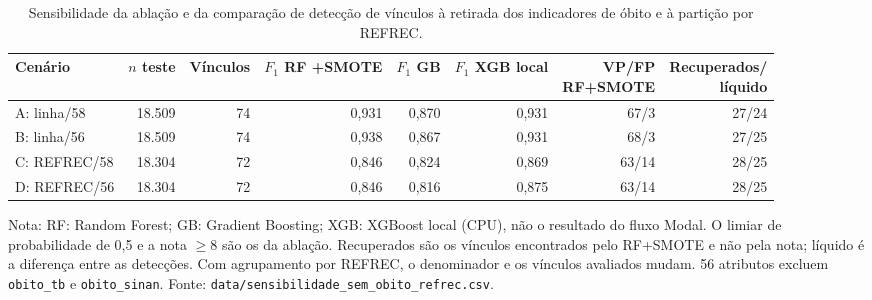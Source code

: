 \begin{table}[htbp]
\centering\footnotesize
\setlength{\tabcolsep}{3pt}
\caption{Sensibilidade da ablação e da comparação de detecção de vínculos à retirada dos indicadores de óbito e à partição por REFREC.}
\label{tab:sensibilidade-2x2}
\begin{tabular}{lrrrrrrr}
\toprule
Cenário & $n$ teste & Vínculos & \shortstack{$F_1$ RF\\+SMOTE} & $F_1$ GB & \shortstack{$F_1$ XGB\\local} & \shortstack{VP/FP\\RF+SMOTE} & \shortstack{Recuperados/\\líquido} \\
\midrule
A: linha/58 & 18.509 & 74 & 0,931 & 0,870 & 0,931 & 67/3 & 27/24 \\
B: linha/56 & 18.509 & 74 & 0,938 & 0,867 & 0,931 & 68/3 & 27/25 \\
C: REFREC/58 & 18.304 & 72 & 0,846 & 0,824 & 0,869 & 63/14 & 28/25 \\
D: REFREC/56 & 18.304 & 72 & 0,846 & 0,816 & 0,875 & 63/14 & 28/25 \\
\bottomrule
\end{tabular}
\par\smallskip\begin{minipage}{\textwidth}\footnotesize
Nota: RF: Random Forest; GB: Gradient Boosting; XGB: XGBoost local (CPU), não o resultado do fluxo Modal. O limiar de probabilidade de 0,5 e a nota $\geq 8$ são os da ablação. Recuperados são os vínculos encontrados pelo RF+SMOTE e não pela nota; líquido é a diferença entre as detecções. Com agrupamento por REFREC, o denominador e os vínculos avaliados mudam. 56 atributos excluem \texttt{obito\_tb} e \texttt{obito\_sinan}. Fonte: \texttt{data/sensibilidade\_sem\_obito\_refrec.csv}.
\end{minipage}
\end{table}
